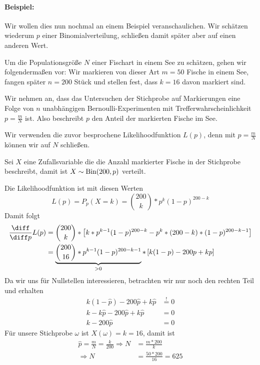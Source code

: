 \paragraph{Beispiel:}
Wir wollen dies nun nochmal an einem Beispiel veranschaulichen. Wir schätzen wiederum $p$ einer Binomialverteilung, schließen damit später aber auf einen anderen Wert.
\begin{eBox}{}{}
	Um die Populationsgröße $N$ einer Fischart in einem See zu schätzen, gehen wir folgendermaßen vor: Wir markieren von dieser Art $m=50$ Fische in einem See, fangen später $n=200$ Stück und stellen fest, dass $k=16$ davon markiert sind.

	Wir nehmen an, dass das Untersuchen der Stichprobe auf Markierungen eine Folge von $n$ unabhängigen Bernoulli-Experimenten mit Trefferwahrscheinlichkeit $p=\frac mN$ ist. Also beschreibt $p$ den Anteil der markierten Fische im See.
\end{eBox}
Wir verwenden die zuvor besprochene Likelihoodfunktion $L(p)$, denn mit $p=\frac mN$ können wir auf $N$ schließen. 

Sei $X$ eine Zufallsvariable die die Anzahl markierter Fische in der Stichprobe beschreibt, damit ist $X \sim \operatorname{Bin}(200,p)$ verteilt. 

Die Likelihoodfunktion ist mit diesen Werten
\begin{equation*}
	L(p)=P_p(X=k)=\binom{200}{k}* p^{k}(1-p)^{200-k}
\end{equation*}
Damit folgt
\begin{align*}
	\frac{\diff}{\diff p}L(p) &= \binom{200}{k}*\left[ k*p^{k-1}(1-p)^{200-k} - p^k*(200-k)*(1-p)^{200-k-1}\right]\\
	&=\underbrace{\binom{200}{16}* p^{k-1}(1-p)^{200-k-1}}_{>0} * \left[ k(1-p)-200p+kp \right]
\end{align*}%
Da wir uns für Nullstellen interessieren, betrachten wir nur noch den rechten Teil und erhalten
\begin{align*}
	k(1-\hat p)-200\hat p+k\hat p&\overset != 0\\
	k-k\hat p-200\hat p+k\hat p &= 0\\
	k-200\hat p&=0
\end{align*}
Für unsere Stichprobe $\omega$ ist $X(\omega)=k=16$, damit ist
\begin{align*}
	\hat p =\frac{m}{N} =\frac k{200}\Rightarrow N&=\frac {m*200}{k}\\
	\Rightarrow N &= \frac{50*200}{16} = 625
\end{align*}

